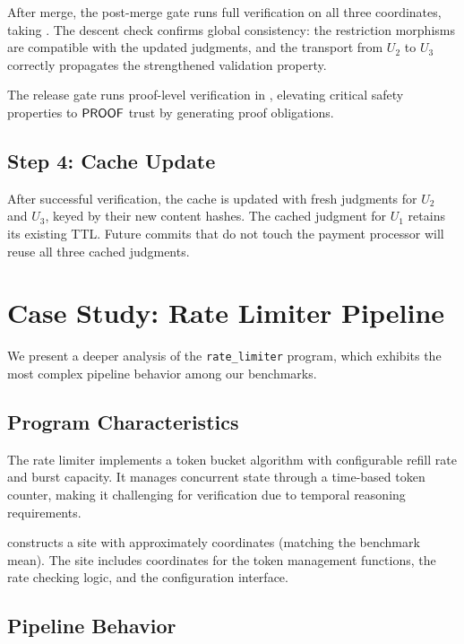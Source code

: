 \documentclass[11pt]{article}
\begin{document}
After merge, the post-merge gate runs full verification on all three
coordinates, taking \ppLXVcipaymentprocessorPost{}. The descent check
confirms global consistency: the restriction morphisms are compatible with
the updated judgments, and the transport from $U_2$ to $U_3$ correctly
propagates the strengthened validation property.

The release gate runs proof-level verification in
\ppLXVcipaymentprocessorRelease{}, elevating critical safety properties to
$\mathsf{PROOF}$ trust by generating \LEAN{} proof obligations.

\subsection{Step 4: Cache Update}

After successful verification, the cache is updated with fresh judgments for
$U_2$ and $U_3$, keyed by their new content hashes. The cached judgment for
$U_1$ retains its existing TTL. Future commits that do not touch the payment
processor will reuse all three cached judgments.

\section{Case Study: Rate Limiter Pipeline}\label{sec:case-study}

We present a deeper analysis of the \texttt{rate\_limiter} program, which
exhibits the most complex pipeline behavior among our benchmarks.

\subsection{Program Characteristics}

The rate limiter implements a token bucket algorithm with configurable
refill rate and burst capacity. It manages concurrent state through a
time-based token counter, making it challenging for verification due to
temporal reasoning requirements.

\JuGeo{} constructs a site with approximately \ppLXVcoordsMean{} coordinates
(matching the benchmark mean). The site includes coordinates for the token
management functions, the rate checking logic, and the configuration
interface.

\subsection{Pipeline Behavior}
\end{document}
